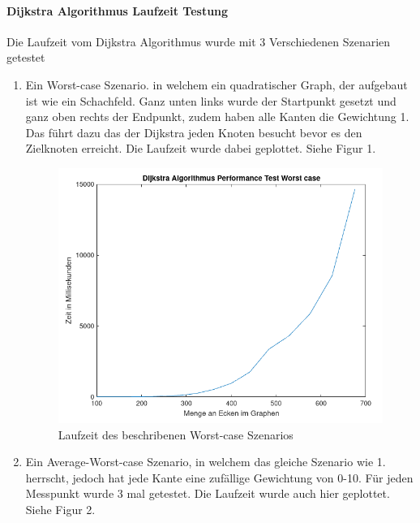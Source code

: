 \documentclass[utf8]{article}
\begin{document}
\paragraph{Dijkstra Algorithmus Laufzeit Testung}
Die Laufzeit vom Dijkstra Algorithmus wurde mit 3 Verschiedenen Szenarien getestet
\begin{enumerate}
  \item Ein Worst-case Szenario. in welchem ein quadratischer Graph, der aufgebaut ist
  wie ein Schachfeld. Ganz unten links wurde der Startpunkt gesetzt und
  ganz oben rechts der Endpunkt, zudem haben alle Kanten die Gewichtung 1.
  Das führt dazu das der Dijkstra jeden Knoten besucht bevor es den Zielknoten
  erreicht. Die Laufzeit wurde dabei geplottet. Siehe Figur 1.

  \begin{figure}[H]
    \centering
    \includegraphics[width=1\textwidth]{Images/Worstcase.png}
    \caption[]{Laufzeit des beschribenen Worst-case Szenarios}
  \end{figure}

  \item Ein Average-Worst-case Szenario, in welchem das gleiche Szenario wie
  1. herrscht, jedoch hat jede Kante eine zufällige Gewichtung von 0-10.
  Für jeden Messpunkt wurde 3 mal getestet. Die Laufzeit wurde auch hier geplottet.
  Siehe Figur 2.


\end{enumerate}
\end{document}
